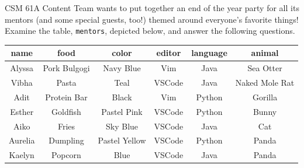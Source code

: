 CSM 61A Content Team wants to put together an end of the year party for all its mentors (and some special guests, too!) themed around everyone's favorite things! Examine the table, \texttt{mentors}, depicted below, and answer the following questions.

\begin{center}
\begin{tabular}{|c|c|c|c|c|c|}
 \hline
 \textbf{name} & \textbf{food} & \textbf{color} & \textbf{editor} & \textbf{language} & \textbf{animal}\\
 \hline
 Alyssa & Pork Bulgogi & Navy Blue & Vim & Java & Sea Otter\\
 \hline
 Vibha & Pasta & Teal & VSCode & Java & Naked Mole Rat\\
 \hline
 Adit & Protein Bar & Black & Vim & Python & Gorilla\\
 \hline
 Esther & Goldfish & Pastel Pink & VSCode & Python & Bunny\\
 \hline
 Aiko & Fries & Sky Blue & VSCode & Java & Cat\\
 \hline
 Aurelia & Dumpling & Pastel Yellow & VSCode & Python & Panda\\
 \hline
 Kaelyn & Popcorn & Blue & VSCode & Java & Panda\\
 \hline
\end{tabular}
\end{center}
